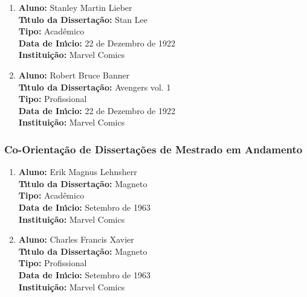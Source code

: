 \documentclass[a4paper,oneside,10pt]{article}
\begin{document}
\begin{enumerate}
\renewcommand{\labelenumi}{{\large\bfseries\arabic{enumi}.}}

\item       \textbf{Aluno:} Stanley Martin Lieber \mbox{}\\
            \textbf{T\'{\i}tulo da Disserta\c{c}\~{a}o:} Stan Lee\\
            \textbf{Tipo:} Acadêmico \\%
            \textbf{Data de In\'{\i}cio:} 22 de Dezembro de 1922\\
            \textbf{Institui\c{c}\~{a}o:} Marvel Comics

\item       \textbf{Aluno:} Robert Bruce Banner \mbox{}\\
            \textbf{T\'{\i}tulo da Disserta\c{c}\~{a}o:} Avengers vol. 1\\
            \textbf{Tipo:} Profissional\\
            \textbf{Data de In\'{\i}cio:} 22 de Dezembro de 1922\\
            \textbf{Institui\c{c}\~{a}o:} Marvel Comics
\end{enumerate}

\subsubsection{Co-Orienta\c{c}\~{a}o de Disserta\c{c}\~{o}es de Mestrado em Andamento}
\vspace{0.3cm}

\begin{enumerate}
\renewcommand{\labelenumi}{{\large\bfseries\arabic{enumi}.}}

\item       \textbf{Aluno:} Erik Magnus Lehnsherr \mbox{}\\
            \textbf{T\'{\i}tulo da Disserta\c{c}\~{a}o:} Magneto\\
            \textbf{Tipo:} Acadêmico \\%
            \textbf{Data de In\'{\i}cio:} Setembro de 1963\\
            \textbf{Institui\c{c}\~{a}o:} Marvel Comics

\item       \textbf{Aluno:} Charles Francis Xavier \mbox{}\\
            \textbf{T\'{\i}tulo da Disserta\c{c}\~{a}o:} Magneto\\
            \textbf{Tipo:} Profissional\\
            \textbf{Data de In\'{\i}cio:} Setembro de 1963\\
            \textbf{Institui\c{c}\~{a}o:} Marvel Comics
\end{enumerate}
\end{document}
